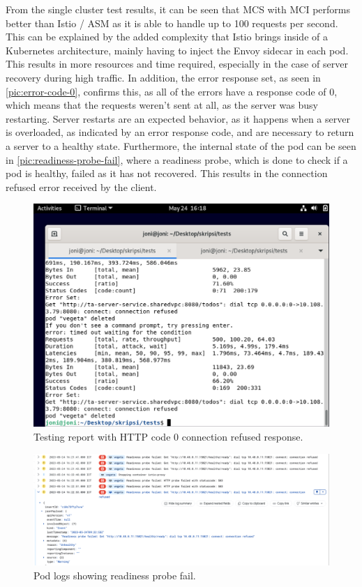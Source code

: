 From the single cluster test results, it can be seen that MCS with MCI performs better than Istio / ASM as it is able to handle up to 100 requests per second. This can be explained by the added complexity that Istio brings inside of a Kubernetes architecture, mainly having to inject the Envoy sidecar in each pod. This results in more resources and time required, especially in the case of server recovery during high traffic. In addition, the error response set, as seen in \autoref{pic:error-code-0}, confirms this, as all of the errors have a response code of 0, which means that the requests weren't sent at all, as the server was busy restarting. Server restarts are an expected behavior, as it happens when a server is overloaded, as indicated by an error response code, and are necessary to return a server to a healthy state. Furthermore, the internal state of the pod can be seen in \autoref{pic:readiness-probe-fail}, where a readiness probe, which is done to check if a pod is healthy, failed as it has not recovered. This results in the connection refused error received by the client.

\begin{figure}
	\centering
	\includegraphics[width=1\textwidth]{assets/pics/error-code-0.png}
	\caption{Testing report with HTTP code 0 connection refused response.}
	\label{pic:error-code-0}
\end{figure}
\begin{figure}
	\centering
	\includegraphics[width=1\textwidth]{assets/pics/readiness-probe-fail.png}
	\caption{Pod logs showing readiness probe fail.}
	\label{pic:readiness-probe-fail}
\end{figure}

